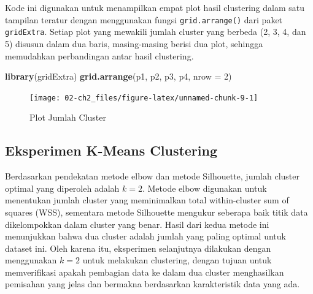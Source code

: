 \documentclass[
  oneside]{book}
\newenvironment{Shaded}{\begin{snugshade}}{\end{snugshade}}
\newcommand{\AttributeTok}[1]{\textcolor[rgb]{0.13,0.29,0.53}{#1}}
\newcommand{\DecValTok}[1]{\textcolor[rgb]{0.00,0.00,0.81}{#1}}
\newcommand{\FunctionTok}[1]{\textcolor[rgb]{0.13,0.29,0.53}{\textbf{#1}}}
\newcommand{\NormalTok}[1]{#1}
\begin{document}
Kode ini digunakan untuk menampilkan empat plot hasil clustering dalam satu tampilan teratur dengan menggunakan fungsi \texttt{grid.arrange()} dari paket \texttt{gridExtra}. Setiap plot yang mewakili jumlah cluster yang berbeda (2, 3, 4, dan 5) disusun dalam dua baris, masing-masing berisi dua plot, sehingga memudahkan perbandingan antar hasil clustering.

\begin{Shaded}
\begin{Highlighting}[]
\FunctionTok{library}\NormalTok{(gridExtra)}
\FunctionTok{grid.arrange}\NormalTok{(p1, p2, p3, p4, }\AttributeTok{nrow =} \DecValTok{2}\NormalTok{)}
\end{Highlighting}
\end{Shaded}

\begin{figure}[h]

{\centering \texttt{[image: 02-ch2\_files/figure-latex/unnamed-chunk-9-1]} 

}

\caption{Plot Jumlah Cluster}\label{fig:unnamed-chunk-9}
\end{figure}

\subsection*{Eksperimen K-Means Clustering}\label{eksperimen-k-means-clustering}

Berdasarkan pendekatan metode elbow dan metode Silhouette, jumlah cluster optimal yang diperoleh adalah \(k=2\). Metode elbow digunakan untuk menentukan jumlah cluster yang meminimalkan total within-cluster sum of squares (WSS), sementara metode Silhouette mengukur seberapa baik titik data dikelompokkan dalam cluster yang benar. Hasil dari kedua metode ini menunjukkan bahwa dua cluster adalah jumlah yang paling optimal untuk dataset ini. Oleh karena itu, eksperimen selanjutnya dilakukan dengan menggunakan \(k=2\) untuk melakukan clustering, dengan tujuan untuk memverifikasi apakah pembagian data ke dalam dua cluster menghasilkan pemisahan yang jelas dan bermakna berdasarkan karakteristik data yang ada.
\end{document}
